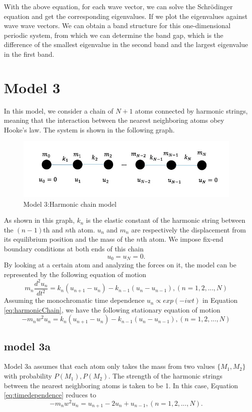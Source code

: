 With the above equation, for each wave vector, we can solve the Schr\"{o}dinger equation and get the corresponding eigenvalues. If we plot the eigenvalues against wave wave vectors. We can obtain a band structure for this one-dimensional periodic system, from which we can determine the band gap, which is the difference of the smallest eigenvalue in the second band and the largest eigenvalue in the first band.

\section{Model 3}
In this model, we consider a chain of $N+1$ atoms connected by harmonic strings, meaning that the interaction between the nearest neighboring atoms obey Hooke's law. The system is shown in the following graph. 
\begin{figure}[h]
\centering
\includegraphics[scale=0.75]{Graphics/harmonicChain.jpeg}
\caption{Model 3:Harmonic chain model}
\label{fig:net}
\end{figure}
As shown in this graph,  $k_n$ is the elastic constant of the harmonic string between the $(n-1)$th and $n$th atom. $u_n$ and $m_n$ are respectively the displacement from its equilibrium position and the mass of the $n$th atom. 
We impose fix-end boundary conditions at both ends of this chain
$$u_0 = u_N = 0.$$
By looking at a certain atom and analyzing the forces on it, the model can be represented by the following equation of motion 
\begin{equation}\label{eq:harmonicChain}
m_n\frac{d^2u_n}{dt^2} = k_n(u_{n+1}-u_n) - k_{n-1}(u_n-u_{n-1}), (n = 1,2,...,N)
\end{equation}
Assuming the monochromatic time dependence $u_n \propto exp(-iwt)$ in Equation \ref{eq:harmonicChain}, we have the following stationary equation of motion \cite{summerPaper}
\begin{equation}\label{eq:timedependence}
-m_nw^2u_n = k_n(u_{n+1}-u_n) - k_{n-1}(u_n-u_{n-1}), (n = 1,2,...,N)
\end{equation}


\subsection{model 3a}
Model 3a assumes that each atom only takes the mass from two values $\{M_1,M_2\}$ with probability ${P(M_1),P(M_2)}$. The strength of the harmonic strings between the nearest neighboring atoms is taken to be 1. In this case, Equation \ref{eq:timedependence} reduces to 
\begin{equation}\label{eq:model 3a}
-m_nw^2u_n = u_{n+1}-2u_n + u_{n-1}, (n = 1,2,...,N). 
\end{equation}

